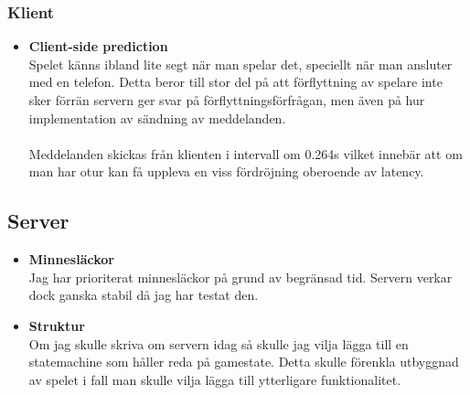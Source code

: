 \documentclass[10pt, titlepage, oneside, a4paper]{article}
\begin{document}
    		\subsubsection{Klient}
    			\begin{itemize}
    				\item\textbf{Client-side prediction}\\Spelet känns ibland lite segt när man spelar det, speciellt när man ansluter med en telefon. Detta beror till stor del på att förflyttning av spelare inte sker förrän servern ger svar på förflyttningsförfrågan, men även på hur implementation av sändning av meddelanden.\\\\Meddelanden skickas från klienten i intervall om 0.264s vilket innebär att om man har otur kan få uppleva en viss fördröjning oberoende av latency.
  					
    			\end{itemize}
    		\subsection{Server}
    			\begin{itemize}
    				\item\textbf{Minnesläckor}\\Jag har prioriterat minnesläckor på grund av begränsad tid. Servern verkar dock ganska stabil då jag har testat den. 
    				\item\textbf{Struktur}\\Om jag skulle skriva om servern idag så skulle jag vilja lägga till en statemachine som håller reda på gamestate. Detta skulle förenkla utbyggnad av spelet i fall man skulle vilja lägga till ytterligare funktionalitet. 
    			\end{itemize}
    		
\end{document}

